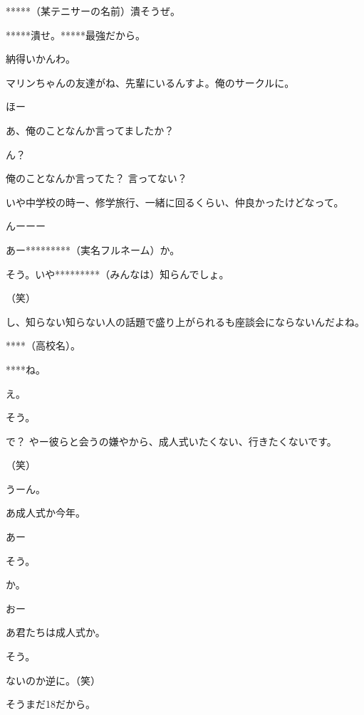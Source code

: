 \begin{multicols}{3}
{        *****（某テニサーの名前）潰そうぜ。

        *****潰せ。*****最強だから。

        納得いかんわ。

        マリンちゃんの友達がね、先輩にいるんすよ。俺のサークルに。

        ほー

        あ、俺のことなんか言ってましたか？

        ん？

        俺のことなんか言ってた？ 言ってない？

        いや中学校の時ー、修学旅行、一緒に回るくらい、仲良かったけどなって。

        んーーー

        あー*********（実名フルネーム）か。

        そう。いや*********（みんなは）知らんでしょ。

        （笑）

        し、知らない知らない人の話題で盛り上がられるも座談会にならないんだよね。

        ****（高校名）。

        ****ね。

        え。

        そう。

        で？ やー彼らと会うの嫌やから、成人式いたくない、行きたくないです。

        （笑）

        うーん。

        あ成人式か今年。

        あー

        そう。

        か。

        おー

        あ君たちは成人式か。

        そう。

        ないのか逆に。（笑）

        そうまだ18だから。

}
\end{multicols}
